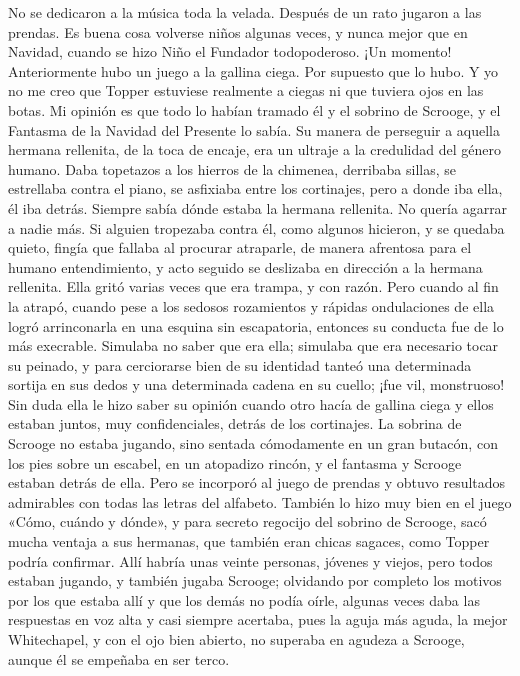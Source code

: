 \documentclass{novela}
\begin{document}
 No se dedicaron a la música toda la velada. Después de un rato jugaron a las prendas. Es buena cosa volverse niños algunas veces, y nunca mejor que en Navidad, cuando se hizo Niño el Fundador todopoderoso. ¡Un momento! Anteriormente hubo un juego a la gallina ciega. Por supuesto que lo hubo. Y yo no me creo que Topper estuviese realmente a ciegas ni que tuviera ojos en las botas. Mi opinión es que todo lo habían tramado él y el sobrino de Scrooge, y el Fantasma de la Navidad del Presente lo sabía. Su manera de perseguir a aquella hermana rellenita, de la toca de encaje, era un ultraje a la credulidad del género humano. Daba topetazos a los hierros de la chimenea, derribaba sillas, se estrellaba contra el piano, se asfixiaba entre los cortinajes, pero a donde iba ella, él iba detrás. Siempre sabía dónde estaba la hermana rellenita. No quería agarrar a nadie más. Si alguien tropezaba contra él, como algunos hicieron, y se quedaba quieto, fingía que fallaba al procurar atraparle, de manera afrentosa para el humano entendimiento, y acto seguido se deslizaba en dirección a la hermana rellenita. Ella gritó varias veces que era trampa, y con razón. Pero cuando al fin la atrapó, cuando pese a los sedosos rozamientos y rápidas ondulaciones de ella logró arrinconarla en una esquina sin escapatoria, entonces su conducta fue de lo más execrable. Simulaba no saber que era ella; simulaba que era necesario tocar su peinado, y para cerciorarse bien de su identidad tanteó una determinada sortija en sus dedos y una determinada cadena en su cuello; ¡fue vil, monstruoso! Sin duda ella le hizo saber su opinión cuando otro hacía de gallina ciega y ellos estaban juntos, muy confidenciales, detrás de los cortinajes.
 La sobrina de Scrooge no estaba jugando, sino sentada cómodamente en un gran butacón, con los pies sobre un escabel, en un atopadizo rincón, y el fantasma y Scrooge estaban detrás de ella. Pero se incorporó al juego de prendas y obtuvo resultados admirables con todas las letras del alfabeto. También lo hizo muy bien en el juego «Cómo, cuándo y dónde», y para secreto regocijo del sobrino de Scrooge, sacó mucha ventaja a sus hermanas, que también eran chicas sagaces, como Topper podría confirmar. Allí habría unas veinte personas, jóvenes y viejos, pero todos estaban jugando, y también jugaba Scrooge; olvidando por completo los motivos por los que estaba allí y que los demás no podía oírle, algunas veces daba las respuestas en voz alta y casi siempre acertaba, pues la aguja más aguda, la mejor Whitechapel, y con el ojo bien abierto, no superaba en agudeza a Scrooge, aunque él se empeñaba en ser terco.
\end{document}

